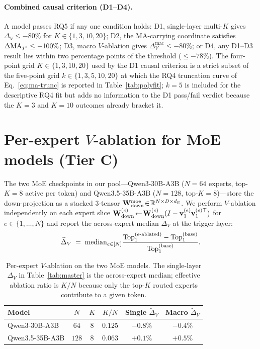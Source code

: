 \paragraph{Combined causal criterion (D1--D4).}
A model passes RQ5 if any one condition holds:
D1, single-layer multi-$K$ gives $\Delta_V \leq -80\%$ for
$K \in \{1,3,10,20\}$;
D2, the MA-carrying coordinate satisfies $\Delta\mathrm{MA}_{j^{*}} \leq -100\%$;
D3, macro $V$-ablation gives $\Delta_V^{\text{mac}} \leq -80\%$;
or D4, any D1--D3 result lies within two percentage points of the threshold
($\leq -78\%$). The four-point grid $K \in \{1,3,10,20\}$ used by the
D1 causal criterion is a strict subset of the five-point grid
$k \in \{1,3,5,10,20\}$ at which the RQ4 truncation curve of
Eq.~\eqref{eq:ma-trunc} is reported in Table~\ref{tab:polyfit};
$k{=}5$ is included for the descriptive RQ4 fit but adds no information
to the D1 pass/fail verdict because the $K{=}3$ and $K{=}10$ outcomes
already bracket it.

\section{Per-expert $V$-ablation for MoE models (Tier C)}
\label{app:moe-per-expert}

The two MoE checkpoints in our pool---Qwen3-30B-A3B
($N{=}64$ experts, top-$K{=}8$ active per token) and
Qwen3.5-35B-A3B ($N{=}128$, top-$K{=}8$)---store the down-projection as
a stacked $3$-tensor
$\mathbf{W}_{\text{down}}^{\text{moe}}\!\in\!\mathbb{R}^{N\times D \times d_{\text{ff}}}$.
We perform $V$-ablation independently on each expert slice
$\mathbf{W}_{\text{down}}^{(e)}\!\leftarrow\!\mathbf{W}_{\text{down}}^{(e)}(I-\mathbf{v}_1^{(e)}\mathbf{v}_1^{(e)\top})$
for $e\!\in\!\{1,\dots,N\}$ and report the
across-expert median $\widetilde{\Delta}_V$ at the trigger layer:
\begin{equation}
  \label{eq:moe-per-expert}
  \widetilde{\Delta}_V \;=\; \mathrm{median}_{e\in[N]}
  \frac{\mathrm{Top}_1^{(e\text{-ablated})} - \mathrm{Top}_1^{(\text{base})}}
       {\mathrm{Top}_1^{(\text{base})}}.
\end{equation}

\begin{table}[h]
  \caption{Per-expert $V$-ablation on the two MoE models. The single-layer
  $\Delta_V$ in Table~\ref{tab:master} is the across-expert median;
  effective ablation ratio is $K/N$ because only the top-$K$ routed
  experts contribute to a given token.}
  \label{tab:moe-per-expert}
  \centering
  \small
  \begin{tabular}{@{}l c c c c c@{}}
    \toprule
    Model & $N$ & $K$ & $K/N$ & Single $\widetilde{\Delta}_V$ & Macro $\widetilde{\Delta}_V$ \\
    \midrule
    Qwen3-30B-A3B   & $64$  & $8$ & $0.125$ & $-0.8\%$ & $-0.4\%$ \\
    Qwen3.5-35B-A3B & $128$ & $8$ & $0.063$ & $+0.1\%$ & $+0.5\%$ \\
    \bottomrule
  \end{tabular}
\end{table}


